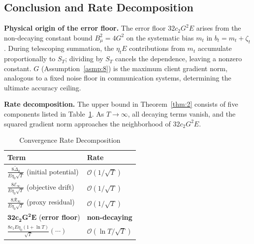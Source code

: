 \documentclass[journal]{IEEEtran}
\begin{document}
\subsection{Conclusion and Rate Decomposition}

\noindent\textbf{Physical origin of the error floor.}
The error floor \(32 c_2 G^2 E\) arises from the non-decaying constant bound
\(B_\mu^2 = 4G^2\) on the systematic bias \(m_t\) in \(b_t = m_t + \zeta_t\).
During telescoping summation, the \(\eta_t E\) contributions from \(m_t\) accumulate proportionally to \(S_T\);
dividing by \(S_T\) cancels the dependence, leaving a nonzero constant.
\(G\) (Assumption~\ref{asmp:8}) is the maximum client gradient norm, analogous to a fixed noise floor in communication systems, determining the ultimate accuracy ceiling.

\noindent\textbf{Rate decomposition.}
The upper bound in Theorem~\ref{thm:2} consists of five components listed in Table~\ref{tab:rate}.
As \(T \to \infty\), all decaying terms vanish, and the squared gradient norm approaches the neighborhood of \(32 c_2 G^2 E\).

\begin{table}[h]
  \centering
  \caption{Convergence Rate Decomposition}\label{tab:rate}
  \begin{tabular}{p{}p{}}
    \toprule
    \textbf{Term} & \textbf{Rate} \\
    \midrule
    \(\frac{8\widetilde\Delta_0}{E\eta_0\sqrt{T}}\) (initial potential) & \(\mathcal O(1/\sqrt{T})\) \\
    \(\frac{8\mathcal E_\infty}{E\eta_0\sqrt{T}}\) (objective drift)    & \(\mathcal O(1/\sqrt{T})\) \\
    \(\frac{8\mathcal R_\infty}{E\eta_0\sqrt{T}}\) (proxy residual)     & \(\mathcal O(1/\sqrt{T})\) \\
    \(\mathbf{32 c_2 G^2 E}\) (\textbf{error floor})                    & \textbf{non-decaying} \\
    \(\frac{8c_1 E\eta_0(1+\ln T)}{\sqrt{T}}(\cdots)\)                  & \(\mathcal O(\ln T/\sqrt{T})\) \\
    \bottomrule
  \end{tabular}
\end{table}

\appendices
\end{document}
